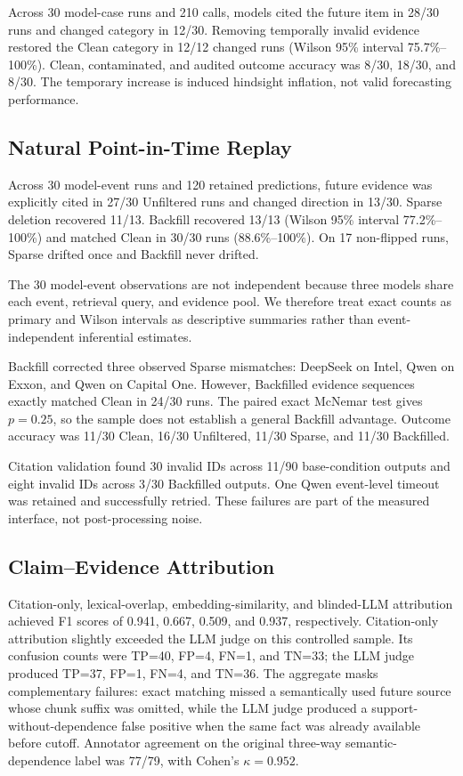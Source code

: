 \documentclass[10pt,twocolumn]{article}
\begin{document}
Across 30 model-case runs and 210 calls, models cited the future item in 28/30 runs
and changed category in 12/30. Removing temporally invalid evidence restored the
Clean category in 12/12 changed runs (Wilson 95\% interval 75.7\%--100\%). Clean,
contaminated, and audited outcome accuracy was 8/30, 18/30, and 8/30. The temporary
increase is induced hindsight inflation, not valid forecasting performance.

\subsection{Natural Point-in-Time Replay}

Across 30 model-event runs and 120 retained predictions, future evidence was
explicitly cited in 27/30 Unfiltered runs and changed direction in 13/30. Sparse
deletion recovered 11/13. Backfill recovered 13/13 (Wilson 95\% interval
77.2\%--100\%) and matched Clean in 30/30 runs (88.6\%--100\%). On 17 non-flipped
runs, Sparse drifted once and Backfill never drifted.

The 30 model-event observations are not independent because three models share each
event, retrieval query, and evidence pool. We therefore treat exact counts as primary
and Wilson intervals as descriptive summaries rather than event-independent
inferential estimates.

Backfill corrected three observed Sparse mismatches: DeepSeek on Intel, Qwen on
Exxon, and Qwen on Capital One. However, Backfilled evidence sequences exactly
matched Clean in 24/30 runs. The paired exact McNemar test gives $p=0.25$, so the
sample does not establish a general Backfill advantage. Outcome accuracy was 11/30
Clean, 16/30 Unfiltered, 11/30 Sparse, and 11/30 Backfilled.

Citation validation found 30 invalid IDs across 11/90 base-condition outputs and
eight invalid IDs across 3/30 Backfilled outputs. One Qwen event-level timeout was
retained and successfully retried. These failures are part of the measured interface,
not post-processing noise.

\subsection{Claim--Evidence Attribution}

Citation-only, lexical-overlap, embedding-similarity, and blinded-LLM attribution
achieved F1 scores of 0.941, 0.667, 0.509, and 0.937, respectively.
Citation-only attribution slightly exceeded the LLM judge on this controlled sample.
Its confusion counts were TP=40, FP=4, FN=1, and TN=33; the LLM judge produced TP=37,
FP=1, FN=4, and TN=36.
The aggregate masks complementary failures: exact matching missed a semantically used
future source whose chunk suffix was omitted, while the LLM judge produced a
support-without-dependence false positive when the same fact was already available
before cutoff. Annotator agreement on the original three-way semantic-dependence
label was 77/79, with Cohen's $\kappa=0.952$.
\end{document}
